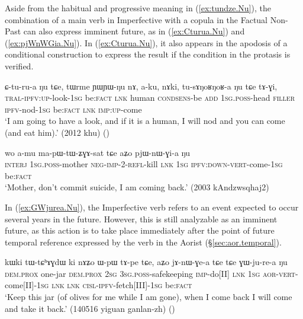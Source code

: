 Aside from the habitual and progressive meaning in (\ref{ex:tundze.Nu}), the  combination of a main verb in Imperfective with a copula in the Factual Non-Past can also express imminent future, as in (\ref{ex:Cturua.Nu}) and (\ref{ex:pjWnWGia.Nu}). In (\ref{ex:Cturua.Nu}), it also appears in the apodosis of a conditional construction to express the result if the condition in the protasis is verified.

\begin{exe}
\ex \label{ex:Cturua.Nu}
\gll  ɕ-tu-ru-a ŋu tɕe, tɯrme ɲɯ\redp{}ɲɯ-ŋu nɤ, a-ku, nɤki, tu-sɤŋoʁŋoʁ-a ŋu tɕe tɤ-ɣi, \\
\textsc{tral}-\textsc{ipfv}:\textsc{up}-look-\textsc{1sg} be:\textsc{fact} \textsc{lnk} human \textsc{cond}\redp{}\textsc{sens}-be \textsc{add} \textsc{1sg}.\textsc{poss}-head \textsc{filler} \textsc{ipfv}-nod-\textsc{1sg} be:\textsc{fact} \textsc{lnk} \textsc{imp}:\textsc{up}-come \\
\glt `I am going to have a look, and if it is a human, I will nod and you can come (and eat him).' (2012 khu)
()
\end{exe}

\begin{exe}
\ex \label{ex:pjWnWGia.Nu}
\gll wo a-mu ma-pɯ-tɯ-ʑɣɤ-sat tɕe aʑo pjɯ-nɯ-ɣi-a ŋu \\
\textsc{interj} \textsc{1sg}.\textsc{poss}-mother \textsc{neg}-\textsc{imp}-2-\textsc{refl}-kill \textsc{lnk} \textsc{1sg} \textsc{ipfv}:\textsc{down}-\textsc{vert}-come-\textsc{1sg} be:\textsc{fact} \\
\glt `Mother, don't commit suicide, I am coming back.' (2003 kAndzwsqhaj2)
\end{exe}

In (\ref{ex:GWjurea.Nu}), the Imperfective verb  refers to an event expected to occur several years in the future. However, this is still analyzable as an imminent future, as this action is to take place immediately after the point of future temporal reference expressed by the verb  in the Aorist (§\ref{sec:aor.temporal}).

\begin{exe}
\ex \label{ex:GWjurea.Nu}
\gll  kɯki tɯ-tɕʰɤɣdɯ ki nɤʑo ɯ-pɯ tɤ-pe tɕe,  aʑo jɤ-nɯ-ɣe-a tɕe tɕe ɣɯ-ju-re-a ŋu\\
\textsc{dem}.\textsc{prox} one-jar \textsc{dem}.\textsc{prox} \textsc{2sg} \textsc{3sg}.\textsc{poss}-safekeeping \textsc{imp}-do[II] \textsc{lnk} \textsc{1sg} \textsc{aor}-\textsc{vert}-come[II]-\textsc{1sg} \textsc{lnk} \textsc{lnk} \textsc{cisl}-\textsc{ipfv}-fetch[III]-\textsc{1sg} be:\textsc{fact}\\
\glt `Keep this jar (of olives for me while I am gone), when I come back I will come and take it back.' (140516 yiguan ganlan-zh)
()
\end{exe}

